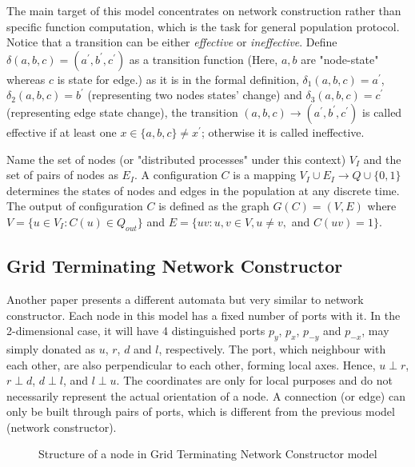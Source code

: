\par\noindent
The main target of this model concentrates on network construction rather than
specific function computation, which is the task for general population protocol. Notice that a transition can be either \textit{effective}
or \textit{ineffective}. Define $\delta(a, b, c) = (a^{'}, b^{'},c^{'})$ as a transition function (Here, $a, b$ are "node-state" whereas $c$ is state for edge.)
as it is in the formal definition, $\delta_{1}(a,b,c) = a^{'}$, $\delta_{2}(a,b,c) = b^{'}$ (representing two nodes states' change)
and $\delta_{3}(a,b,c) = c^{'}$ (representing edge state change), the transition $(a,b,c) \to (a^{'}, b^{'},c^{'})$ is called
effective if at least one $x \in \{a,b,c\} \not= x^{'} $; otherwise it is called ineffective.


\par\noindent
Name the set of nodes (or "distributed processes" under this context) $V_{I}$ and the set of pairs of nodes as $E_{I}$.
A configuration $C$ is a mapping $ V_{I} \cup E_{I} \to Q \cup \{0,1\} $ determines the states of nodes and edges in the population at any discrete time.
The output of configuration $C$ is defined as the graph $G(C) = (V, E) $ where $V = \{u \in V_{I}: C(u) \in Q_{out}\}$
and  $E = \{uv: u, v \in V, u \not= v,$ and $C(uv) = 1\}$.

\subsection{Grid Terminating Network Constructor \cite{Mi17} \label{IntroToGrid}}

\par\noindent
Another paper \cite{Mi17} presents a different automata but very similar to network constructor. Each node in this
model has a fixed number of ports with it. In the 2-dimensional case, it will have 4 distinguished ports
$p_{y}$, $p_{x}$, $p_{-y}$ and $p_{-x}$, may simply donated as $u$, $r$, $d$ and $l$, respectively.
The port, which neighbour with each other, are also perpendicular to each other, forming local axes. Hence,
$ u \perp r $, $ r \perp d $, $ d \perp l $, and  $ l \perp u $. The coordinates are only for local purposes and
do not necessarily represent the actual orientation of a node. A connection (or edge) can only be built through
pairs of ports, which is different from the previous model (network constructor).


\par\noindent
\begin{figure}[H]
\begin{center}
\end{center}
\caption{Structure of a node in Grid Terminating Network Constructor model}
\end{figure}


